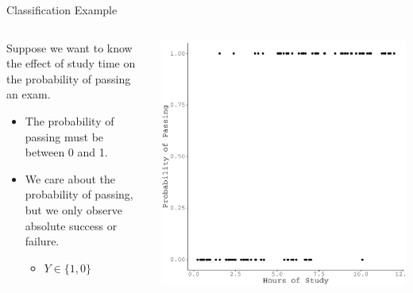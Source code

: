 \documentclass{beamer}\usepackage[]{graphicx}\usepackage[]{color}
\makeatletter
\def\maxwidth{ %
  \ifdim\Gin@nat@width>\linewidth
    \linewidth
  \else
    \Gin@nat@width
  \fi
}
\newenvironment{knitrout}{}{} %
\makeatother
\begin{document}
\watermarkoff %

\begin{frame}{Classification Example}

  \begin{columns}
    \begin{column}{0.5\textwidth}
      
      Suppose we want to know the effect of study time on the probability of
      passing an exam.  
      \vc
      \begin{itemize}
      \item The probability of passing must be between 0 and 1.
        \vc
      \item We care about the probability of passing, but we only observe 
        absolute success or failure.
        \vc
        \begin{itemize}
        \item $Y \in \{1, 0\}$
        \end{itemize}
      \end{itemize}
      
      \end{column}
    
    \begin{column}{0.5\textwidth}
      
\begin{knitrout}\footnotesize
{}\color{fgcolor}

{\centering \includegraphics[width=\maxwidth]{figure/unnamed-chunk-1-1} 

}



\end{knitrout}

\end{column}
\end{columns}

\end{frame}
\end{document}
